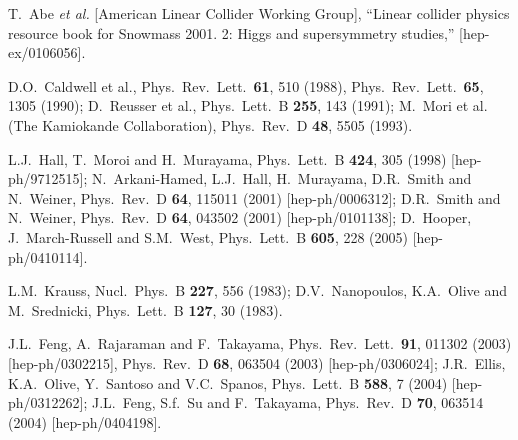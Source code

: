 \documentclass[11pt]{article}
\begin{document}
\begin{thebibliography}{999}
T.~Abe {\it et al.}  [American Linear Collider Working Group],
  ``Linear collider physics resource book for Snowmass 2001. 2: Higgs and
  supersymmetry studies,''
  [hep-ex/0106056].

D.O.~Caldwell et al., 
  Phys.\ Rev.\ Lett.\  {\bf 61}, 510 (1988),
  Phys.\ Rev.\ Lett.\  {\bf 65}, 1305 (1990);
D.~Reusser et al., 
  Phys.\ Lett.\ B {\bf 255}, 143 (1991);
M.~Mori et al. (The Kamiokande Collaboration),
  Phys.\ Rev.\ D {\bf 48}, 5505 (1993).

L.J.~Hall, T.~Moroi and H.~Murayama,
  Phys.\ Lett.\ B {\bf 424}, 305 (1998)
  [hep-ph/9712515];
N.~Arkani-Hamed, L.J.~Hall, H.~Murayama, D.R.~Smith and N.~Weiner,
  Phys.\ Rev.\ D {\bf 64}, 115011 (2001)
  [hep-ph/0006312];
D.R.~Smith and N.~Weiner,
  Phys.\ Rev.\ D {\bf 64}, 043502 (2001)
  [hep-ph/0101138];
D.~Hooper, J.~March-Russell and S.M.~West,
  Phys.\ Lett.\ B {\bf 605}, 228 (2005)
  [hep-ph/0410114].
    
L.M.~Krauss,
  Nucl.\ Phys.\ B {\bf 227}, 556 (1983);
D.V.~Nanopoulos, K.A.~Olive and M.~Srednicki,
  Phys.\ Lett.\ B {\bf 127}, 30 (1983).

J.L.~Feng, A.~Rajaraman and F.~Takayama,
  Phys.\ Rev.\ Lett.\  {\bf 91}, 011302 (2003)
  [hep-ph/0302215],
  Phys.\ Rev.\ D {\bf 68}, 063504 (2003)
  [hep-ph/0306024];
J.R.~Ellis, K.A.~Olive, Y.~Santoso and V.C.~Spanos,
  Phys.\ Lett.\ B {\bf 588}, 7 (2004)
  [hep-ph/0312262];
J.L.~Feng, S.f.~Su and F.~Takayama,
  Phys.\ Rev.\ D {\bf 70}, 063514 (2004)
  [hep-ph/0404198].


\end{thebibliography}
\end{document}
